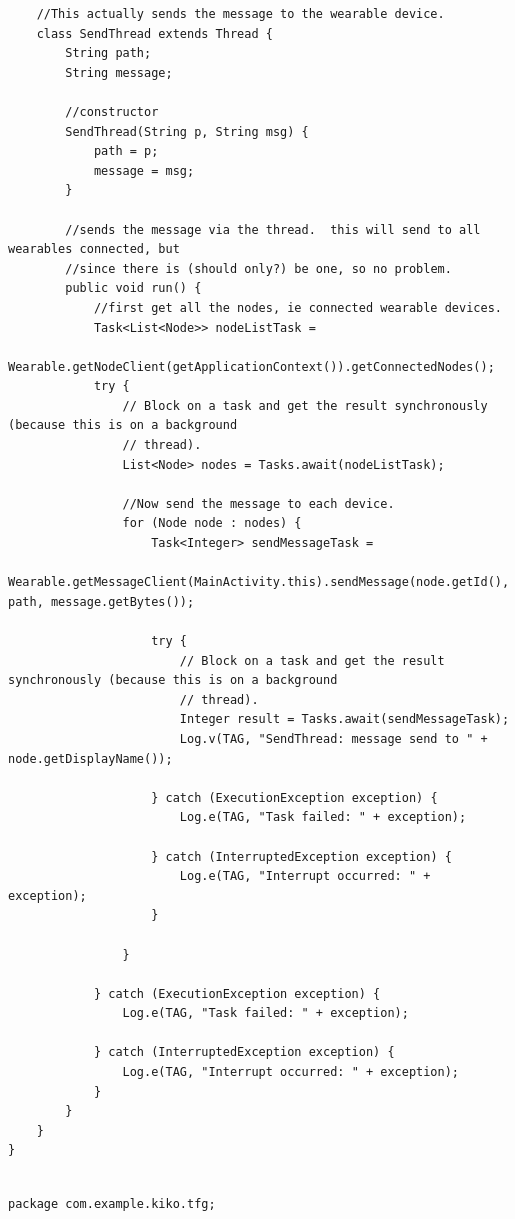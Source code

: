 \documentclass[12pt]{book}
\numberwithin{equation}{section}
\begin{document}
\begin{appendices}
\begin{verbatim}
    //This actually sends the message to the wearable device.
    class SendThread extends Thread {
        String path;
        String message;

        //constructor
        SendThread(String p, String msg) {
            path = p;
            message = msg;
        }

        //sends the message via the thread.  this will send to all wearables connected, but
        //since there is (should only?) be one, so no problem.
        public void run() {
            //first get all the nodes, ie connected wearable devices.
            Task<List<Node>> nodeListTask =
                    Wearable.getNodeClient(getApplicationContext()).getConnectedNodes();
            try {
                // Block on a task and get the result synchronously (because this is on a background
                // thread).
                List<Node> nodes = Tasks.await(nodeListTask);

                //Now send the message to each device.
                for (Node node : nodes) {
                    Task<Integer> sendMessageTask =
                            Wearable.getMessageClient(MainActivity.this).sendMessage(node.getId(), path, message.getBytes());

                    try {
                        // Block on a task and get the result synchronously (because this is on a background
                        // thread).
                        Integer result = Tasks.await(sendMessageTask);
                        Log.v(TAG, "SendThread: message send to " + node.getDisplayName());

                    } catch (ExecutionException exception) {
                        Log.e(TAG, "Task failed: " + exception);

                    } catch (InterruptedException exception) {
                        Log.e(TAG, "Interrupt occurred: " + exception);
                    }

                }

            } catch (ExecutionException exception) {
                Log.e(TAG, "Task failed: " + exception);

            } catch (InterruptedException exception) {
                Log.e(TAG, "Interrupt occurred: " + exception);
            }
        }
    }
}


\end{verbatim}

\newpage
\begin{verbatim}
package com.example.kiko.tfg;


\end{verbatim}
\end{appendices}
\end{document}
